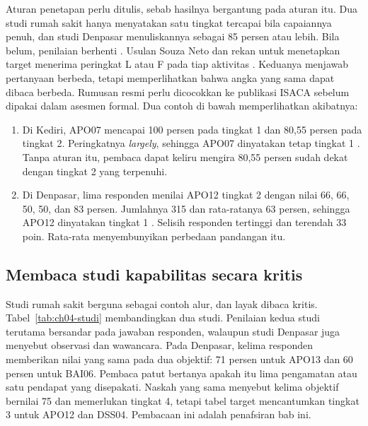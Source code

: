Aturan penetapan perlu ditulis, sebab hasilnya bergantung pada aturan itu. Dua studi rumah sakit hanya menyatakan satu tingkat tercapai bila capaiannya
penuh, dan studi Denpasar menuliskannya sebagai 85 persen atau lebih. Bila belum, penilaian berhenti \cite{c04-denpasar,c04-wilujeng}. Usulan Souza Neto dan
rekan untuk menetapkan target menerima peringkat L atau F pada tiap aktivitas \cite{c04-kapabilitas}. Keduanya menjawab pertanyaan berbeda, tetapi memperlihatkan
bahwa angka yang sama dapat dibaca berbeda. Rumusan resmi perlu dicocokkan ke publikasi ISACA sebelum dipakai dalam asesmen formal. Dua contoh di bawah
memperlihatkan akibatnya:
\begin{enumerate}
  \item Di Kediri, APO07 mencapai 100 persen pada tingkat 1 dan 80,55 persen pada tingkat 2. Peringkatnya \textit{largely}, sehingga APO07 dinyatakan tetap
  tingkat 1 \cite{c04-wilujeng}. Tanpa aturan itu, pembaca dapat keliru mengira 80,55 persen sudah dekat dengan tingkat 2 yang terpenuhi.
  \item Di Denpasar, lima responden menilai APO12 tingkat 2 dengan nilai 66, 66, 50, 50, dan 83 persen. Jumlahnya 315 dan rata-ratanya 63 persen, sehingga APO12
  dinyatakan tingkat 1 \cite{c04-denpasar}. Selisih responden tertinggi dan terendah 33 poin. Rata-rata menyembunyikan perbedaan pandangan itu.
\end{enumerate}

\subsection*{Membaca studi kapabilitas secara kritis}

Studi rumah sakit berguna sebagai contoh alur, dan layak dibaca kritis. Tabel~\ref{tab:ch04-studi} membandingkan dua studi. Penilaian kedua studi terutama bersandar
pada jawaban responden, walaupun studi Denpasar juga menyebut observasi dan wawancara. Pada Denpasar, kelima responden memberikan nilai yang sama pada dua objektif:
71 persen untuk APO13 dan 60 persen untuk BAI06. Pembaca patut bertanya apakah itu lima pengamatan atau satu pendapat yang disepakati. Naskah yang sama menyebut kelima
objektif bernilai 75 dan memerlukan tingkat 4, tetapi tabel target mencantumkan tingkat 3 untuk APO12 dan DSS04. Pembacaan ini adalah penafsiran bab ini.


